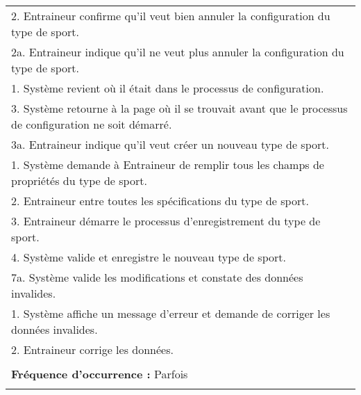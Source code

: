 \begin{longtable}{|p{16cm}|}
	\hspace{1cm}2. Entraineur confirme qu'il veut bien annuler la configuration du type de sport.\\
	\hspace{2cm}2a. Entraineur indique qu'il ne veut plus annuler la configuration du type de sport.\\
	\hspace{3cm}1. Système revient où il était dans le processus de configuration.\\
	\hspace{1cm}3. Système retourne à la page où il se trouvait avant que le processus de configuration ne soit démarré.\\
	3a. Entraineur indique qu'il veut créer un nouveau type de sport.\\
	\hspace{1cm}1. Système demande à Entraineur de remplir tous les champs de propriétés du type de sport.\\
	\hspace{1cm}2. Entraineur entre toutes les spécifications du type de sport.\\
	\hspace{1cm}3. Entraineur démarre le processus d'enregistrement du type de sport.\\
	\hspace{1cm}4. Système valide et enregistre le nouveau type de sport.\\
	7a. Système valide les modifications et constate des données invalides.\\
	\hspace{1cm}1. Système affiche un message d'erreur et demande de corriger les données invalides.\\
	\hspace{1cm}2. Entraineur corrige les données.\\
	\\
	\textbf{Fréquence d'occurrence :} Parfois\\
	\\
	\hline
\end{longtable}



